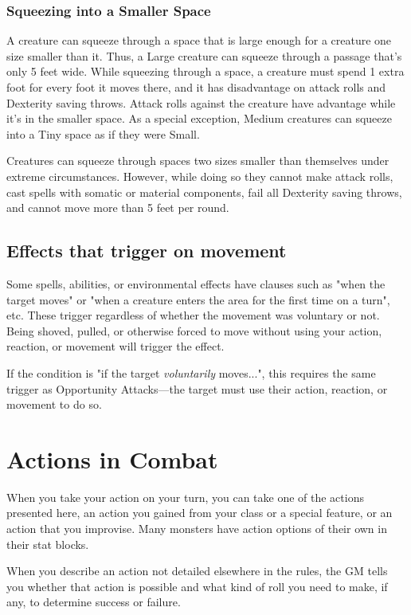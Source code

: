 \subsubsection{Squeezing into a Smaller Space}

A creature can squeeze through a space that is large enough for a creature one size smaller than it. Thus, a Large creature can squeeze through a passage that's only 5 feet wide. While squeezing through a space, a creature must spend 1 extra foot for every foot it moves there, and it has disadvantage on attack rolls and Dexterity saving throws. Attack rolls against the creature have advantage while it's in the smaller space. As a special exception, Medium creatures can squeeze into a Tiny space as if they were Small.

Creatures can squeeze through spaces two sizes smaller than themselves under extreme circumstances. However, while doing so they cannot make attack rolls, cast spells with somatic or material components, fail all Dexterity saving throws, and cannot move more than 5 feet per round.

\subsection{Effects that trigger on movement}
Some spells, abilities, or environmental effects have clauses such as "when the target moves" or "when a creature enters the area for the first time on a turn", etc. These trigger regardless of whether the movement was voluntary or not. Being shoved, pulled, or otherwise forced to move without using your action, reaction, or movement will trigger the effect.

If the condition is "if the target \textit{voluntarily} moves...", this requires the same trigger as Opportunity Attacks---the target must use their action, reaction, or movement to do so.

\section{Actions in Combat}\label{sec:actions-in-combat}

When you take your action on your turn, you can take one of the actions presented here, an action you gained from your class or a special feature, or an action that you improvise. Many monsters have action options of their own in their stat blocks.

When you describe an action not detailed elsewhere in the rules, the GM tells you whether that action is possible and what kind of roll you need to make, if any, to determine success or failure.


